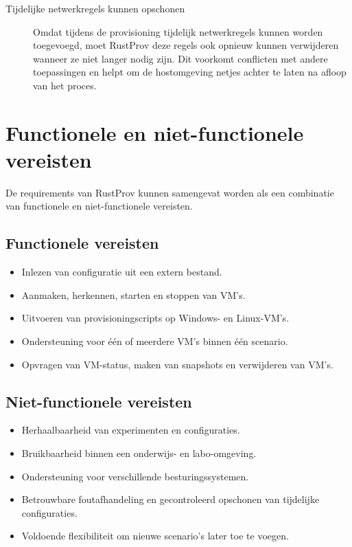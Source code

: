 \begin{description}
    \item[Tijdelijke netwerkregels kunnen opschonen] Omdat tijdens de provisioning tijdelijk netwerkregels kunnen worden toegevoegd, moet RustProv deze regels ook opnieuw kunnen verwijderen wanneer ze niet langer nodig zijn. Dit voorkomt conflicten met andere toepassingen en helpt om de hostomgeving netjes achter te laten na afloop van het proces.
\end{description}

\section{Functionele en niet-functionele vereisten}
De requirements van RustProv kunnen samengevat worden als een combinatie van functionele en niet-functionele vereisten.

\subsection*{Functionele vereisten}
\begin{itemize}
    \item Inlezen van configuratie uit een extern bestand.
    \item Aanmaken, herkennen, starten en stoppen van VM’s.
    \item Uitvoeren van provisioningscripts op Windows- en Linux-VM’s.
    \item Ondersteuning voor één of meerdere VM’s binnen één scenario.
    \item Opvragen van VM-status, maken van snapshots en verwijderen van VM’s.
\end{itemize}

\subsection*{Niet-functionele vereisten}
\begin{itemize}
    \item Herhaalbaarheid van experimenten en configuraties.
    \item Bruikbaarheid binnen een onderwijs- en labo-omgeving.
    \item Ondersteuning voor verschillende besturingssystemen.
    \item Betrouwbare foutafhandeling en gecontroleerd opschonen van tijdelijke configuraties.
    \item Voldoende flexibiliteit om nieuwe scenario’s later toe te voegen.
\end{itemize}

